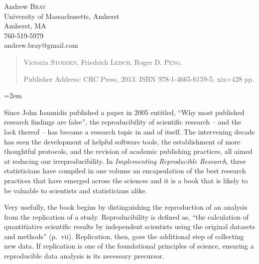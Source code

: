 \documentclass[12pt]{article}
\begin{document}
\noindent
Andrew \textsc{Bray}\\
University of Massachusetts, Amherst \\
Amherst, MA \\
760-519-5979 \\
andrew.bray@gmail.com\\
\medskip

\begin{quote}
Victoria \textsc{Stodden},
Friedrich \textsc{Leisch},
Roger D. \textsc{Peng}.

Publisher Address: CRC Press, 2013. ISBN 978-1-4665-6159-5. 
xix+428 pp. 
\end{quote}

\thispagestyle{empty}
\raggedright\baselineskip=18pt\parindent=2em\parskip=5pt


Since John Ioannidis published a paper in 2005 entitled, ``Why most published research
findings are false'', the reproducibility of scientific research -- and the lack
thereof -- has become a research topic in and of itself.  The intervening decade
has seen the development of helpful software tools, the establishment of more
thoughtful protocols, and the revision of academic publishing practices, all 
aimed at reducing our irreproducibility. In \emph{Implementing Reproducible Research}, 
three statisticians have compiled in one volume an encapsulation of the best 
research practices that have emerged across the sciences and it is a book that
is likely to be valuable to scientists and statisticians alike.

Very usefully, the book begins by distinguishing the reproduction of an analysis
from the replication of a study. Reproducibility is defined as, ``the calculation of 
quantitiative scientific results by independent scientists using the original 
datasets and methods'' (p.\ vii). Replication, then, goes the additional step of 
collecting new data. If replication is one of the foundational principles of 
science, ensuring a reproducible data analysis is its necessary precursor.
\end{document}
